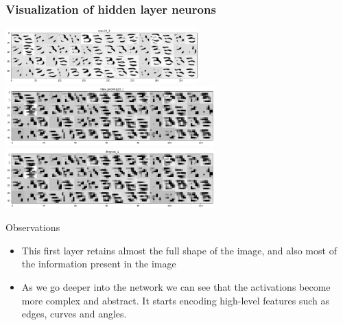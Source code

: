 \documentclass[12pt,t]{beamer}
\begin{document}
\begin{frame}
    \frametitle{Visualization of hidden layer neurons}

    \includegraphics[width=\linewidth,height=60pt]{convolution_network/layer_visualization.png}
    \includegraphics[width=\linewidth,height=65pt]{convolution_network/layer_visualization_pooling.png}
    \includegraphics[width=\linewidth,height=65pt]{convolution_network/layer_visualization_dropout.png}
    

\end{frame}

\begin{frame}
    \large Observations
  
    \begin{itemize}
        \item This first layer retains almost the full shape of the image, and also most 
             of the information present in the image
        \item As we go deeper into the network we can see that the activations become more complex and abstract.
             It starts encoding high-level features such as edges, curves and angles.
    \end{itemize}
\end{frame}
\end{document}
